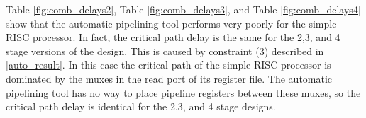 Table \ref{fig:comb_delays2}, Table \ref{fig:comb_delays3}, and Table \ref{fig:comb_delays4} show that the automatic pipelining tool performs very poorly for the simple RISC processor. In fact, the critical path delay is the same for the 2,3, and 4 stage versions of the design. This is caused by constraint (3) described in \ref{auto_result}. In this case the critical path of the simple RISC processor is dominated by the muxes in the read port of its register file. The automatic pipelining tool has no way to place pipeline registers between these muxes, so the critical path delay is identical for the 2,3, and 4 stage designs.

